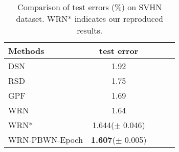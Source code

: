 \documentclass[twocolumn]{article}
\begin{document}
\begin{table}[t]
\caption{Comparison of test errors ($\%$) on SVHN dataset. WRN* indicates our reproduced results.}
\label{table:WR}
\vskip 0.0in
\begin{center}
\begin{small}
\begin{tabular}{lcc|cr}
\hline
Methods & test error   \\
\hline
DSN~\cite{2015_AISTATS_Lee}     & 1.92 \\
RSD ~\cite{2016_ECCV_Huang}    & 1.75 \\
GPF ~\cite{2015_AISTATS_Lee}   & 1.69 \\
WRN  ~\cite{2016_CoRR_Zagoruyko}   & 1.64 \\
\hline
WRN*    & 1.644($\pm$ 0.046) \\
WRN-PBWN-Epoch    & \textbf{1.607}($\pm$ 0.005) \\
\hline
\end{tabular}
\end{small}
\end{center}
  \vspace{-0.1in}
\end{table}


\end{document}
